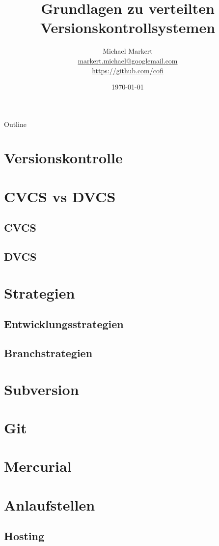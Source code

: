 \documentclass[presentation]{beamer}
\title{Grundlagen zu verteilten Versionskontrollsystemen}
\author[Michael Markert]{Michael Markert\\
  \href{mailto:markert.michael@googlemail.com}{markert.michael@googlemail.com}\\
  \url{https://github.com/cofi}}
\date{\today}
\begin{document}
\begin{frame}[plain]
  \titlepage
\end{frame}

\begin{frame}{Outline}
  \setcounter{tocdepth}{1}
  \tableofcontents
\end{frame}
\section{Versionskontrolle}
\section{CVCS vs DVCS}
\subsection{CVCS}
\subsection{DVCS}

\section{Strategien}
\subsection{Entwicklungsstrategien}
\subsection{Branchstrategien}

\section{Subversion}
\section{Git}
\section{Mercurial}

\section{Anlaufstellen}
\subsection{Hosting}
\end{document}
